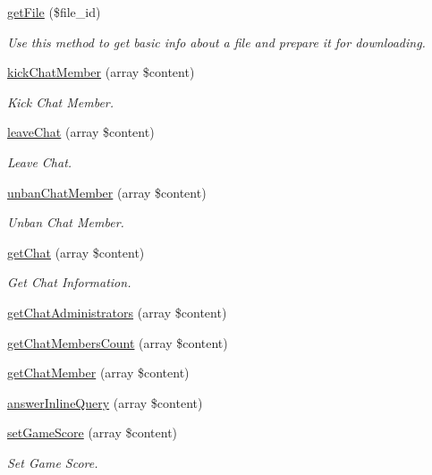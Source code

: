 \begin{DoxyCompactItemize}
\hyperlink{class_telegram_acb201ffc034063cfd347962c49ad5ad9}{get\-File} (\$file\-\_\-id)
\begin{DoxyCompactList}\small\item\em Use this method to get basic info about a file and prepare it for downloading. \end{DoxyCompactList}\item 
\hyperlink{class_telegram_a165397f59469136d25b445a83b6fd13b}{kick\-Chat\-Member} (array \$content)
\begin{DoxyCompactList}\small\item\em Kick Chat Member. \end{DoxyCompactList}\item 
\hyperlink{class_telegram_ab5d2552e116deb2f9c3940f3e09b4e7a}{leave\-Chat} (array \$content)
\begin{DoxyCompactList}\small\item\em Leave Chat. \end{DoxyCompactList}\item 
\hyperlink{class_telegram_abb59232bb0fd79760521c8e81ea0f9b8}{unban\-Chat\-Member} (array \$content)
\begin{DoxyCompactList}\small\item\em Unban Chat Member. \end{DoxyCompactList}\item 
\hyperlink{class_telegram_a84b0d627829ac32122cf771094f3cffb}{get\-Chat} (array \$content)
\begin{DoxyCompactList}\small\item\em Get Chat Information. \end{DoxyCompactList}\item 
\hyperlink{class_telegram_a9ef409fa4668818b134c349553ccebd9}{get\-Chat\-Administrators} (array \$content)
\item 
\hyperlink{class_telegram_aaeb16972df57138d5efa3579085ebb5f}{get\-Chat\-Members\-Count} (array \$content)
\item 
\hyperlink{class_telegram_a744f71c0b62f310e2b2c665071509fec}{get\-Chat\-Member} (array \$content)
\item 
\hyperlink{class_telegram_aae2439e89943ccea30fd724ad5ae9a89}{answer\-Inline\-Query} (array \$content)
\item 
\hyperlink{class_telegram_adc67d74632a07c0f50875d8e35304463}{set\-Game\-Score} (array \$content)
\begin{DoxyCompactList}\small\item\em Set Game Score. \end{DoxyCompactList}\item 

\end{DoxyCompactItemize}

